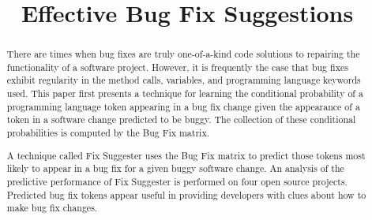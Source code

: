 \documentclass[10pt, conference, letterpaper, compsocconf]{IEEEtran}
\begin{document}
\title{Effective Bug Fix Suggestions}

\author{
}
% 
		
\maketitle

\begin{abstract}

There are times when bug fixes are truly one-of-a-kind code solutions to repairing the functionality of a software project. However, it is frequently the case that bug fixes exhibit regularity in the method calls, variables, and programming language keywords used. This paper first presents a technique for learning the conditional probability of a programming language token appearing in a bug fix change given the appearance of a token in a software change predicted to be buggy. The collection of these conditional probabilities is computed by the Bug Fix matrix.

A technique called Fix Suggester uses the Bug Fix matrix to predict those tokens most likely to appear in a bug fix for a given buggy software change. An analysis of the predictive performance of Fix Suggester is performed on four open source projects. Predicted bug fix tokens appear useful in providing developers with clues about how to make bug fix changes.

\end{abstract}
\end{document}
